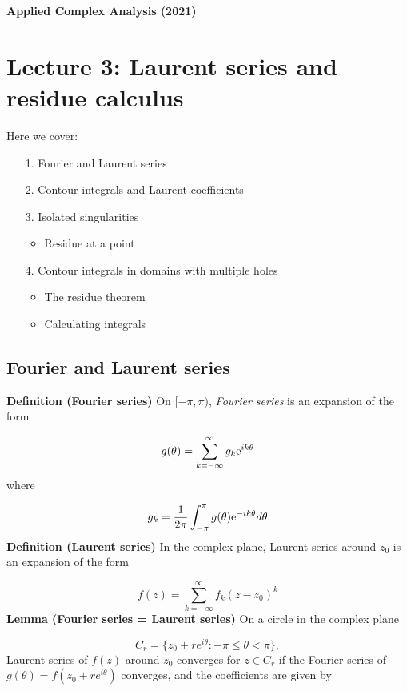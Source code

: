 \documentclass[12pt,landscape]{article}
\def\E{ {\rm e} }
\begin{document}
{\LARGE
\sf
\textbf{Applied Complex Analysis (2021)}

\section{Lecture 3: Laurent series and residue calculus}
Here we cover:

\begin{itemize}
\item[1. ] Fourier and Laurent series


\item[2. ] Contour integrals and Laurent coefficients


\item[3. ] Isolated singularities

\begin{itemize}
\item Residue at a point

\end{itemize}

\item[4. ] Contour integrals in domains with multiple holes

\begin{itemize}
\item The residue theorem


\item Calculating integrals

\end{itemize}
\end{itemize}
\newpage
\subsection{Fourier and Laurent series}
\textbf{Definition (Fourier series)} On $[-\pi, \pi)$,  \emph{Fourier series} is an expansion of the form

\[
    g(\theta) = \sum_{k=-\infty}^\infty g_k \E^{i k \theta}
\]
where

\[
g_k = {1\over 2 \pi} \int_{-\pi}^\pi g(\theta) \E^{-i k \theta} d \theta
\]
\textbf{Definition (Laurent series)} In the complex plane, Laurent series around $z_0$ is an expansion of the form

\[
    f(z) = \sum_{k=-\infty}^\infty f_k (z-z_0)^k
\]
\newpage
\textbf{Lemma (Fourier series = Laurent series)} On a circle in the complex plane

\[
    C_r = \{z_0 + re^{i \theta} : -\pi \leq \theta < \pi \},
\]
Laurent series of $f(z)$ around $z_0$ converges for $z \in C_r$ if the Fourier series of $g(\theta) = f(z_0 + r e^{i \theta})$ converges, and the coefficients are given by

}
\end{document}
